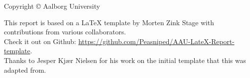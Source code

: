 \thispagestyle{empty}
{\small
\strut\vfill %
\noindent Copyright \copyright{}\the\year{} Aalborg University\\
\par
\noindent This report is based on a LaTeX template by Morten Zink Stage with contributions from various collaborators.\\
Check it out on Github: \url{https://github.com/Peasniped/AAU-LateX-Report-template}.\\
Thanks to Jesper Kjær Nielsen for his work on the initial template that this was adapted from.\par
\vspace{0.2cm}
\noindent \myColophon
}

\clearpage